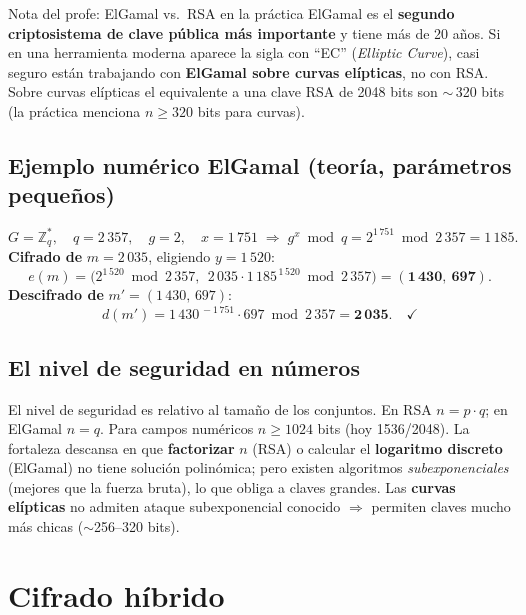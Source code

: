 \documentclass[11pt,a4paper]{article}
\newcommand{\Zn}{\mathbb{Z}}
\begin{document}
\begin{practbox}{Nota del profe: ElGamal vs.\ RSA en la práctica}
ElGamal es el \textbf{segundo criptosistema de clave pública más importante} y tiene más de 20
años. Si en una herramienta moderna aparece la sigla con ``EC'' (\emph{Elliptic Curve}), casi
seguro están trabajando con \textbf{ElGamal sobre curvas elípticas}, no con RSA. Sobre curvas
elípticas el equivalente a una clave RSA de 2048 bits son $\sim$\,320 bits (la práctica menciona
$n\ge 320$ bits para curvas).
\end{practbox}

\subsection{Ejemplo numérico ElGamal (teoría, parámetros pequeños)}
\begin{slidebox}
\[
  G=\Zn_q^{\ast},\quad q=2\,357,\quad g=2,\quad x=1\,751 \;\Rightarrow\;
  g^{x}\bmod q = 2^{1\,751}\bmod 2\,357 = 1\,185.
\]
\textbf{Cifrado de} $m=2\,035$, eligiendo $y=1\,520$:
\[
  e(m) = \bigl(2^{1\,520}\bmod 2\,357,\ \ 2\,035\cdot 1\,185^{\,1\,520}\bmod 2\,357\bigr)
       = (\mathbf{1\,430},\ \mathbf{697}).
\]
\textbf{Descifrado de} $m'=(1\,430,\,697)$:
\[
  d(m') = 1\,430^{\,-1\,751}\cdot 697 \bmod 2\,357 = \mathbf{2\,035}. \quad\checkmark
\]
\end{slidebox}

\subsection{El nivel de seguridad en números}
\begin{slidebox}
El nivel de seguridad es relativo al tamaño de los conjuntos. En RSA $n=p\cdot q$; en ElGamal
$n=q$. Para campos numéricos $n\ge 1024$ bits (hoy 1536/2048). La fortaleza descansa en que
\textbf{factorizar} $n$ (RSA) o calcular el \textbf{logaritmo discreto} (ElGamal) no tiene
solución polinómica; pero existen algoritmos \emph{subexponenciales} (mejores que la fuerza
bruta), lo que obliga a claves grandes. Las \textbf{curvas elípticas} no admiten ataque
subexponencial conocido $\Rightarrow$ permiten claves mucho más chicas ($\sim$256--320 bits).
\end{slidebox}

\section{Cifrado híbrido}
\end{document}
